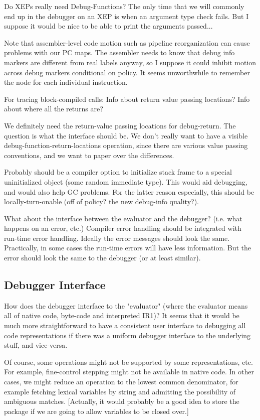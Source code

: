 Do XEPs really need Debug-Functions?  The only time that we will commonly end
up in the debugger on an XEP is when an argument type check fails.  But I
suppose it would be nice to be able to print the arguments passed...


Note that assembler-level code motion such as pipeline reorganization can cause
problems with our PC maps.  The assembler needs to know that debug info markers
are different from real labels anyway, so I suppose it could inhibit motion
across debug markers conditional on policy.  It seems unworthwhile to remember
the node for each individual instruction.


For tracing block-compiled calls:
    Info about return value passing locations?
    Info about where all the returns are?

We definitely need the return-value passing locations for debug-return.  The
question is what the interface should be.  We don't really want to have a
visible debug-function-return-locations operation, since there are various
value passing conventions, and we want to paper over the differences.


Probably should be a compiler option to initialize stack frame to a special
uninitialized object (some random immediate type).  This would aid debugging,
and would also help GC problems.  For the latter reason especially, this should
be locally-turn-onable (off of policy?  the new debug-info quality?).


What about the interface between the evaluator and the debugger? (i.e. what
happens on an error, etc.)  Compiler error handling should be integrated with
run-time error handling.  Ideally the error messages should look the same.
Practically, in some cases the run-time errors will have less information.  But
the error should look the same to the debugger (or at least similar).



\subsection{Debugger Interface}

How does the debugger interface to the "evaluator" (where the evaluator means
all of native code, byte-code and interpreted IR1)?  It seems that it would be
much more straightforward to have a consistent user interface to debugging
all code representations if there was a uniform debugger interface to the
underlying stuff, and vice-versa.  

Of course, some operations might not be supported by some representations, etc.
For example, fine-control stepping might not be available in native code.
In other cases, we might reduce an operation to the lowest common denominator,
for example fetching lexical variables by string and admitting the possibility
of ambiguous matches.  [Actually, it would probably be a good idea to store the
package if we are going to allow variables to be closed over.]

